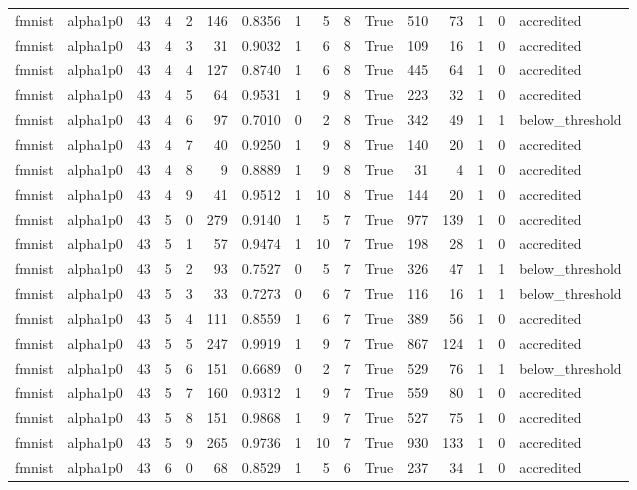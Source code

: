 \begin{tabular}{llrrrrrrrrrrrrrl}
fmnist & alpha1p0 & 43 & 4 & 2 & 146 & 0.8356 & 1 & 5 & 8 & True & 510 & 73 & 1 & 0 & accredited \\
fmnist & alpha1p0 & 43 & 4 & 3 & 31 & 0.9032 & 1 & 6 & 8 & True & 109 & 16 & 1 & 0 & accredited \\
fmnist & alpha1p0 & 43 & 4 & 4 & 127 & 0.8740 & 1 & 6 & 8 & True & 445 & 64 & 1 & 0 & accredited \\
fmnist & alpha1p0 & 43 & 4 & 5 & 64 & 0.9531 & 1 & 9 & 8 & True & 223 & 32 & 1 & 0 & accredited \\
fmnist & alpha1p0 & 43 & 4 & 6 & 97 & 0.7010 & 0 & 2 & 8 & True & 342 & 49 & 1 & 1 & below\_threshold \\
fmnist & alpha1p0 & 43 & 4 & 7 & 40 & 0.9250 & 1 & 9 & 8 & True & 140 & 20 & 1 & 0 & accredited \\
fmnist & alpha1p0 & 43 & 4 & 8 & 9 & 0.8889 & 1 & 9 & 8 & True & 31 & 4 & 1 & 0 & accredited \\
fmnist & alpha1p0 & 43 & 4 & 9 & 41 & 0.9512 & 1 & 10 & 8 & True & 144 & 20 & 1 & 0 & accredited \\
fmnist & alpha1p0 & 43 & 5 & 0 & 279 & 0.9140 & 1 & 5 & 7 & True & 977 & 139 & 1 & 0 & accredited \\
fmnist & alpha1p0 & 43 & 5 & 1 & 57 & 0.9474 & 1 & 10 & 7 & True & 198 & 28 & 1 & 0 & accredited \\
fmnist & alpha1p0 & 43 & 5 & 2 & 93 & 0.7527 & 0 & 5 & 7 & True & 326 & 47 & 1 & 1 & below\_threshold \\
fmnist & alpha1p0 & 43 & 5 & 3 & 33 & 0.7273 & 0 & 6 & 7 & True & 116 & 16 & 1 & 1 & below\_threshold \\
fmnist & alpha1p0 & 43 & 5 & 4 & 111 & 0.8559 & 1 & 6 & 7 & True & 389 & 56 & 1 & 0 & accredited \\
fmnist & alpha1p0 & 43 & 5 & 5 & 247 & 0.9919 & 1 & 9 & 7 & True & 867 & 124 & 1 & 0 & accredited \\
fmnist & alpha1p0 & 43 & 5 & 6 & 151 & 0.6689 & 0 & 2 & 7 & True & 529 & 76 & 1 & 1 & below\_threshold \\
fmnist & alpha1p0 & 43 & 5 & 7 & 160 & 0.9312 & 1 & 9 & 7 & True & 559 & 80 & 1 & 0 & accredited \\
fmnist & alpha1p0 & 43 & 5 & 8 & 151 & 0.9868 & 1 & 9 & 7 & True & 527 & 75 & 1 & 0 & accredited \\
fmnist & alpha1p0 & 43 & 5 & 9 & 265 & 0.9736 & 1 & 10 & 7 & True & 930 & 133 & 1 & 0 & accredited \\
fmnist & alpha1p0 & 43 & 6 & 0 & 68 & 0.8529 & 1 & 5 & 6 & True & 237 & 34 & 1 & 0 & accredited \\

\end{tabular}
